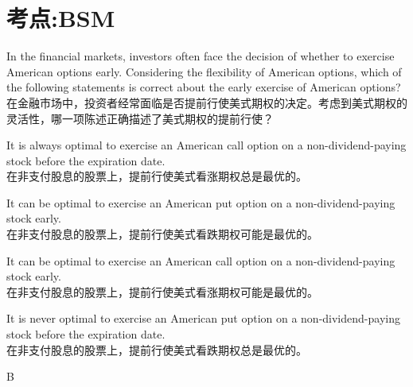 \documentclass{article}
\newcounter{question} %
\begin{document}
\fi







\iftrue
\section{考点:BSM}
\setcounter{question}{0}


\begin{question}
    In the financial markets, investors often face the decision of whether to exercise American options early. Considering the flexibility of American options, which of the following statements is correct about the early exercise of American options?\\
    在金融市场中，投资者经常面临是否提前行使美式期权的决定。考虑到美式期权的灵活性，哪一项陈述正确描述了美式期权的提前行使？
\end{question}

\begin{choices}
    \item It is always optimal to exercise an American call option on a non-dividend-paying stock before the expiration date. \\
    在非支付股息的股票上，提前行使美式看涨期权总是最优的。
    \item It can be optimal to exercise an American put option on a non-dividend-paying stock early. \\
    在非支付股息的股票上，提前行使美式看跌期权可能是最优的。
    \item It can be optimal to exercise an American call option on a non-dividend-paying stock early. \\
    在非支付股息的股票上，提前行使美式看涨期权可能是最优的。
    \item It is never optimal to exercise an American put option on a non-dividend-paying stock before the expiration date. \\
    在非支付股息的股票上，提前行使美式看跌期权总是最优的。
\end{choices}

\begin{correctanswer}
    B
\end{correctanswer}
\end{document}
